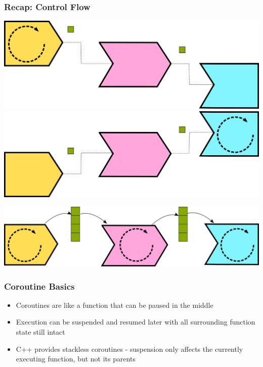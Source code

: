 \documentclass[aspectratio=169]{beamer}
\begin{document}
\begin{frame}

  \frametitle{Recap: Control Flow}
  
  \includegraphics[height=.25\textheight]{pipelinesgfx/pipe_pd_000.png} \hfill
  \includegraphics[height=.25\textheight]{pipelinesgfx/pipe_cd_000.png}
  
  \vspace{10pt}
  
  \begin{center}
  \includegraphics[height=.25\textheight]{pipelinesgfx/pipe_parallel.png}
  \end{center}
\end{frame}

\begin{frame}
    \frametitle{Coroutine Basics}
    
    \begin{itemize}
    \item Coroutines are like a function that can be paused in the middle
    \item Execution can be suspended and resumed later with all surrounding function state still intact
    \item C++ provides stackless coroutines - suspension only affects the currently executing function, but not its parents
    \end{itemize}
    
\end{frame}
\end{document}
